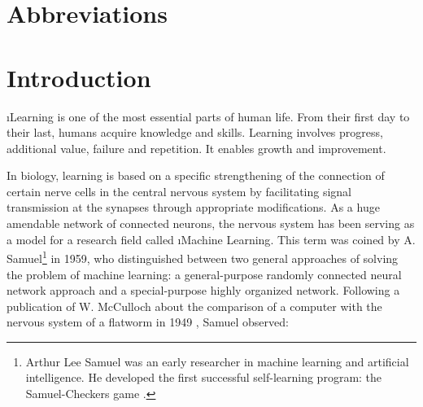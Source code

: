 \listoftables

\chapter*{Abbreviations}\label{s.abbr}
\begin{acronym}[----------------]
\end{acronym}

\chapter{Introduction}\label{c.introduction}

\i{Learning} is one of the most essential parts of human life. From their first day to their last, humans acquire knowledge and skills. Learning involves progress, additional value, failure and repetition. It enables growth and improvement.

In biology, learning is based on a specific strengthening of the connection of certain nerve cells in the central nervous system by facilitating signal transmission at the synapses through appropriate modifications. As a huge amendable network of connected neurons, the nervous system has been serving as a model for a research field called \i{Machine Learning}. This term was coined by A. Samuel\footnote{Arthur Lee Samuel was an early researcher in machine learning and artificial intelligence. He developed the first successful self-learning program: the Samuel-Checkers game \cite{samuel1959}.} \cite{samuel1959} in 1959, who distinguished between two general approaches of solving the problem of machine learning: a general-purpose randomly connected neural network approach and a special-purpose highly organized network. Following a publication of  W. McCulloch about the comparison of a computer with the nervous system of a flatworm in 1949 \cite{mcculloch1949}, Samuel observed:

